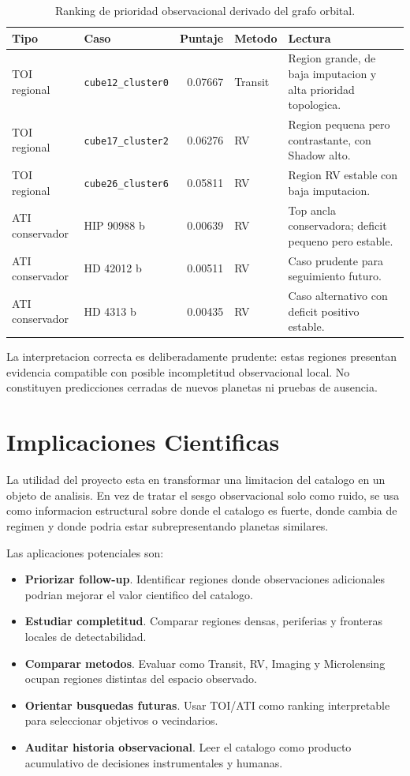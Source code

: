 \documentclass[11pt]{article}
\begin{document}
\begin{table}[H]
\centering
\caption{Ranking de prioridad observacional derivado del grafo orbital.}
\begin{tabularx}{\linewidth}{llrlX}
\toprule
Tipo & Caso & Puntaje & Metodo & Lectura \\
\midrule
TOI regional & \texttt{cube12\_cluster0} & 0.07667 & Transit & Region grande, de baja imputacion y alta prioridad topologica. \\
TOI regional & \texttt{cube17\_cluster2} & 0.06276 & RV & Region pequena pero contrastante, con Shadow alto. \\
TOI regional & \texttt{cube26\_cluster6} & 0.05811 & RV & Region RV estable con baja imputacion. \\
ATI conservador & HIP 90988 b & 0.00639 & RV & Top ancla conservadora; deficit pequeno pero estable. \\
ATI conservador & HD 42012 b & 0.00511 & RV & Caso prudente para seguimiento futuro. \\
ATI conservador & HD 4313 b & 0.00435 & RV & Caso alternativo con deficit positivo estable. \\
\bottomrule
\end{tabularx}
\end{table}

La interpretacion correcta es deliberadamente prudente: estas regiones presentan evidencia compatible con posible incompletitud observacional local. No constituyen predicciones cerradas de nuevos planetas ni pruebas de ausencia.

\section{Implicaciones Cientificas}

La utilidad del proyecto esta en transformar una limitacion del catalogo en un objeto de analisis. En vez de tratar el sesgo observacional solo como ruido, se usa como informacion estructural sobre donde el catalogo es fuerte, donde cambia de regimen y donde podria estar subrepresentando planetas similares.

Las aplicaciones potenciales son:
\begin{itemize}
  \item \textbf{Priorizar follow-up}. Identificar regiones donde observaciones adicionales podrian mejorar el valor cientifico del catalogo.
  \item \textbf{Estudiar completitud}. Comparar regiones densas, periferias y fronteras locales de detectabilidad.
  \item \textbf{Comparar metodos}. Evaluar como Transit, RV, Imaging y Microlensing ocupan regiones distintas del espacio observado.
  \item \textbf{Orientar busquedas futuras}. Usar TOI/ATI como ranking interpretable para seleccionar objetivos o vecindarios.
  \item \textbf{Auditar historia observacional}. Leer el catalogo como producto acumulativo de decisiones instrumentales y humanas.
\end{itemize}
\end{document}

